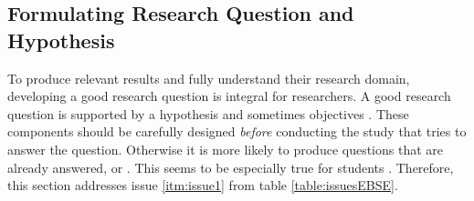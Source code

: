 
\subsection{Formulating Research Question and Hypothesis}
\label{subsec:formulating research question and hypothesis}

To produce relevant results and fully understand their research domain, developing a good research question is integral for researchers. A good research question is supported by a hypothesis and sometimes objectives \cite{Farrugia2009}. These components should be carefully designed \emph{before} conducting the study that tries to answer the question. Otherwise it is more likely to produce questions that are already answered, or  \cite[p. 280]{Farrugia2009}. This seems to be especially true for students \cite{Rainer2006}. Therefore, this section addresses issue \ref{itm:issue1} from table \ref{table:issuesEBSE}.
